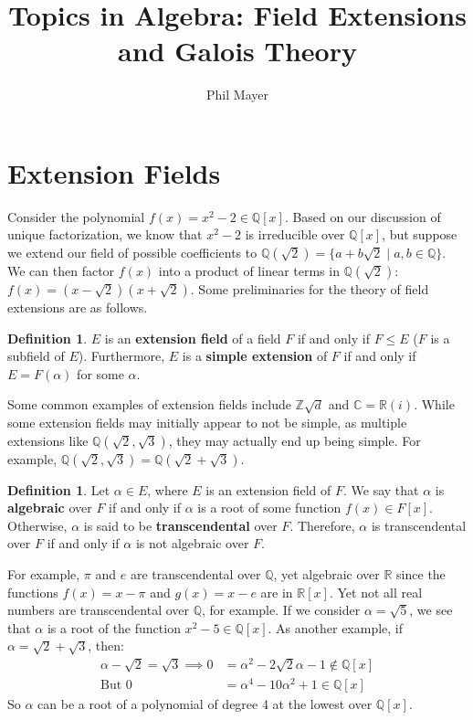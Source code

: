 \documentclass[11pt]{amsart}
\title{Topics in Algebra: Field Extensions and Galois Theory}
\author{Phil Mayer}
\theoremstyle{definition}
\newtheorem{definition}[theorem]{Definition}
\newcommand{\complexNumbers}{\mathbb{C}}
\newcommand{\reals}{\mathbb{R}}
\newcommand{\rationals}{\mathbb{Q}}
\newcommand{\zd}{\mathbb{Z}\sqrt{d}} %
\begin{document}
\maketitle

\section{Extension Fields}
Consider the polynomial $f(x) = x^2 - 2 \in \rationals[x]$. Based on our discussion of unique factorization, we know that $x^2 - 2$ is irreducible
over $\rationals[x]$, but suppose we extend our field of possible coefficients to $\rationals(\sqrt{2}) = \{ a + b\sqrt{2} \mid a, b \in \rationals \}$. We
can then factor $f(x)$ into a product of linear terms in $\rationals(\sqrt{2})$: $f(x) = (x - \sqrt{2})(x + \sqrt{2})$. Some preliminaries for the theory
of field extensions are as follows.

\begin{definition}
	$E$ is an \textbf{extension field} of a field $F$ if and only if $F \leq E$ ($F$ is a subfield of $E$). Furthermore, $E$ is a \textbf{simple
	extension} of $F$ if and only if $E = F(\alpha)$ for some $\alpha$.
\end{definition}
Some common examples of extension fields include $\zd$ and $\complexNumbers = \reals(i)$. While some extension fields may initially appear
to not be simple, as multiple extensions like $\rationals(\sqrt{2}, \sqrt{3})$, they may actually end up being simple. For example,
$\rationals(\sqrt{2}, \sqrt{3}) = \rationals(\sqrt{2} + \sqrt{3})$.
\begin{definition}
	Let $\alpha \in E$, where $E$ is an extension field of $F$. We say that $\alpha$ is \textbf{algebraic} over $F$ if and only if $\alpha$ is a root
	of some function $f(x) \in F[x]$. Otherwise, $\alpha$ is said to be \textbf{transcendental} over $F$. Therefore, $\alpha$ is transcendental
	over $F$ if and only if $\alpha$ is not algebraic over $F$.
\end{definition}
For example, $\pi$ and $e$ are transcendental over $\rationals$, yet algebraic over $\reals$ since the functions $f(x) = x - \pi$ and $g(x) = x - e$
are in $\reals[x]$. Yet not all real numbers are transcendental over $\rationals$, for example. If we consider $\alpha = \sqrt{5}$, we see that
$\alpha$ is a root of the function $x^2 - 5 \in \rationals[x]$. As another example, if $\alpha = \sqrt{2} + \sqrt{3}$, then:
\begin{align*}
	\alpha - \sqrt{2} = \sqrt{3} \implies 0&= \alpha^2 - 2\sqrt{2}\alpha - 1 \notin \rationals[x] \\
	\text{But } 0 &= \alpha^4 - 10\alpha^2 + 1 \in \rationals[x]
\end{align*}
So $\alpha$ can be a root of a polynomial of degree 4 at the lowest over $\rationals[x]$.
\end{document}
